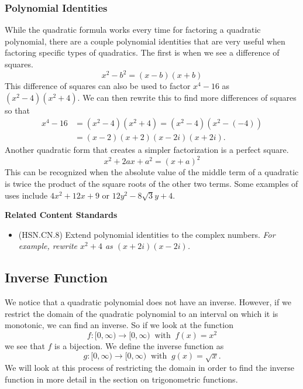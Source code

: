 \documentclass[
]{book}
\providecommand{\tightlist}{%
  \setlength{\itemsep}{0pt}\setlength{\parskip}{0pt}}
\newenvironment{standards}{}{}
\theoremstyle{definition}
\theoremstyle{definition}
\theoremstyle{definition}
\theoremstyle{definition}
\theoremstyle{remark}
\begin{document}
\hypertarget{polynomial-identities}{%
\subsubsection{Polynomial Identities}\label{polynomial-identities}}

While the quadratic formula works every time for factoring a quadratic polynomial, there are a couple polynomial identities that are very useful when factoring specific types of quadratics. The first is when we see a difference of squares.
\[x^2-b^2= (x-b)(x+b)\]
This difference of squares can also be used to factor \(x^4-16\) as \((x^2-4)(x^2+4)\). We can then rewrite this to find more differences of squares so that
\begin{align*}
x^4-16 &= (x^2-4)(x^2+4) = (x^2-4)(x^2- (-4)) \\
&= (x-2)(x+2)(x-2i)(x+2i).
\end{align*}
Another quadratic form that creates a simpler factorization is a perfect square.
\[x^2+2ax+a^2 = (x+a)^2\]
This can be recognized when the absolute value of the middle term of a quadratic is twice the product of the square roots of the other two terms. Some examples of uses include \(4x^2+12x +9\) or \(12y^2-8\sqrt{3} y +4\).

\begin{standards}

\begin{center}
\textbf{Related Content Standards}

\end{center}

\begin{itemize}
\tightlist
\item
  (HSN.CN.8) Extend polynomial identities to the complex numbers. \textit{For example, rewrite $x^2 + 4$ as $(x + 2i)(x - 2i)$.}\\
\end{itemize}

\end{standards}

\hypertarget{inverse-function}{%
\subsection{Inverse Function}\label{inverse-function}}

We notice that a quadratic polynomial does not have an inverse. However, if we restrict the domain of the quadratic polynomial to an interval on which it is monotonic, we can find an inverse. So if we look at the function
\[f:[0,\infty) \rightarrow [0,\infty) \: \mbox{ with } \: f(x)=x^2\] we see that \(f\) is a bijection. We define the inverse function as \[g:[0,\infty) \rightarrow [0,\infty) \: \mbox{ with } \: g(x)=\sqrt{x}.\] We will look at this process of restricting the domain in order to find the inverse function in more detail in the section on trigonometric functions.
\end{document}
